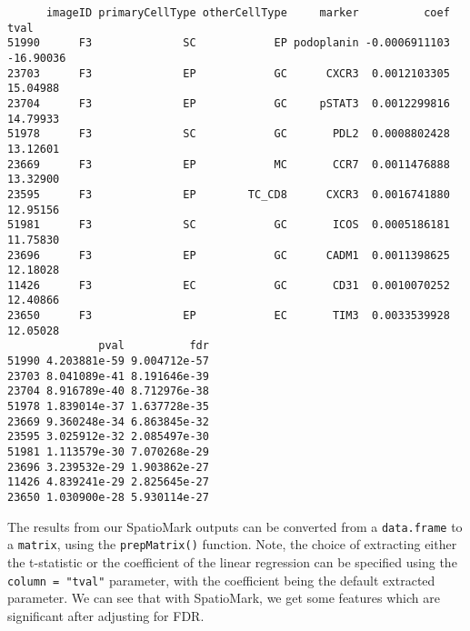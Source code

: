 \documentclass[
  letterpaper,
  DIV=11,
  numbers=noendperiod]{scrreprt}
\newenvironment{Shaded}{\begin{snugshade}}{\end{snugshade}}
\newcommand{\AttributeTok}[1]{\textcolor[rgb]{0.40,0.45,0.13}{#1}}
\newcommand{\DecValTok}[1]{\textcolor[rgb]{0.68,0.00,0.00}{#1}}
\newcommand{\FunctionTok}[1]{\textcolor[rgb]{0.28,0.35,0.67}{#1}}
\newcommand{\NormalTok}[1]{\textcolor[rgb]{0.00,0.23,0.31}{#1}}
\newcommand{\OtherTok}[1]{\textcolor[rgb]{0.00,0.23,0.31}{#1}}
\newcommand{\SpecialCharTok}[1]{\textcolor[rgb]{0.37,0.37,0.37}{#1}}
\newcommand{\StringTok}[1]{\textcolor[rgb]{0.13,0.47,0.30}{#1}}
\begin{document}
\begin{Shaded}
\end{Shaded}

\begin{verbatim}
      imageID primaryCellType otherCellType     marker          coef      tval
51990      F3              SC            EP podoplanin -0.0006911103 -16.90036
23703      F3              EP            GC      CXCR3  0.0012103305  15.04988
23704      F3              EP            GC     pSTAT3  0.0012299816  14.79933
51978      F3              SC            GC       PDL2  0.0008802428  13.12601
23669      F3              EP            MC       CCR7  0.0011476888  13.32900
23595      F3              EP        TC_CD8      CXCR3  0.0016741880  12.95156
51981      F3              SC            GC       ICOS  0.0005186181  11.75830
23696      F3              EP            GC      CADM1  0.0011398625  12.18028
11426      F3              EC            GC       CD31  0.0010070252  12.40866
23650      F3              EP            EC       TIM3  0.0033539928  12.05028
              pval          fdr
51990 4.203881e-59 9.004712e-57
23703 8.041089e-41 8.191646e-39
23704 8.916789e-40 8.712976e-38
51978 1.839014e-37 1.637728e-35
23669 9.360248e-34 6.863845e-32
23595 3.025912e-32 2.085497e-30
51981 1.113579e-30 7.070268e-29
23696 3.239532e-29 1.903862e-27
11426 4.839241e-29 2.825645e-27
23650 1.030900e-28 5.930114e-27
\end{verbatim}

The results from our SpatioMark outputs can be converted from a
\texttt{data.frame} to a \texttt{matrix}, using the
\texttt{prepMatrix()} function. Note, the choice of extracting either
the t-statistic or the coefficient of the linear regression can be
specified using the \texttt{column\ =\ "tval"} parameter, with the
coefficient being the default extracted parameter. We can see that with
SpatioMark, we get some features which are significant after adjusting
for FDR.
\end{document}
